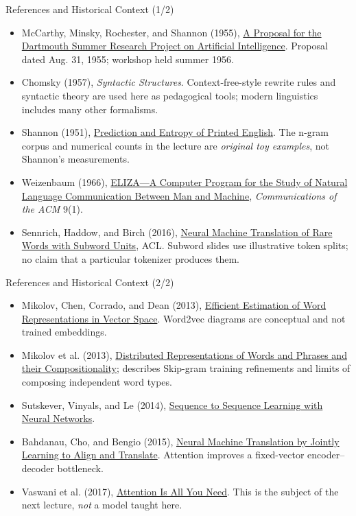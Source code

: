 \documentclass[aspectratio=169,10pt]{beamer}
\begin{document}
\begin{frame}{References and Historical Context (1/2)}
\scriptsize
\begin{itemize}
\item McCarthy, Minsky, Rochester, and Shannon (1955), \href{https://www-formal.stanford.edu/jmc/history/dartmouth.pdf}{A Proposal for the Dartmouth Summer Research Project on Artificial Intelligence}. Proposal dated Aug. 31, 1955; workshop held summer 1956.
\item Chomsky (1957), \emph{Syntactic Structures}. Context-free-style rewrite rules and syntactic theory are used here as pedagogical tools; modern linguistics includes many other formalisms.
\item Shannon (1951), \href{https://doi.org/10.1002/j.1538-7305.1951.tb01366.x}{Prediction and Entropy of Printed English}. The n-gram corpus and numerical counts in the lecture are \emph{original toy examples}, not Shannon's measurements.
\item Weizenbaum (1966), \href{https://doi.org/10.1145/365153.365168}{ELIZA---A Computer Program for the Study of Natural Language Communication Between Man and Machine}, \emph{Communications of the ACM} 9(1).
\item Sennrich, Haddow, and Birch (2016), \href{https://aclanthology.org/P16-1162/}{Neural Machine Translation of Rare Words with Subword Units}, ACL. Subword slides use illustrative token splits; no claim that a particular tokenizer produces them.
\end{itemize}
\end{frame}

\begin{frame}{References and Historical Context (2/2)}
\scriptsize
\begin{itemize}
\item Mikolov, Chen, Corrado, and Dean (2013), \href{https://arxiv.org/abs/1301.3781}{Efficient Estimation of Word Representations in Vector Space}. Word2vec diagrams are conceptual and not trained embeddings.
\item Mikolov et al. (2013), \href{https://arxiv.org/abs/1310.4546}{Distributed Representations of Words and Phrases and their Compositionality}; describes Skip-gram training refinements and limits of composing independent word types.
\item Sutskever, Vinyals, and Le (2014), \href{https://proceedings.neurips.cc/paper_files/paper/2014/hash/5a18e133cbf9f257297f410bb7eca942-Abstract.html}{Sequence to Sequence Learning with Neural Networks}.
\item Bahdanau, Cho, and Bengio (2015), \href{https://arxiv.org/abs/1409.0473}{Neural Machine Translation by Jointly Learning to Align and Translate}. Attention improves a fixed-vector encoder--decoder bottleneck.
\item Vaswani et al. (2017), \href{https://proceedings.neurips.cc/paper_files/paper/2017/hash/3f5ee243547dee91fbd053c1c4a845aa-Abstract.html}{Attention Is All You Need}. This is the subject of the next lecture, \emph{not} a model taught here.
\end{itemize}
\end{frame}
\end{document}
